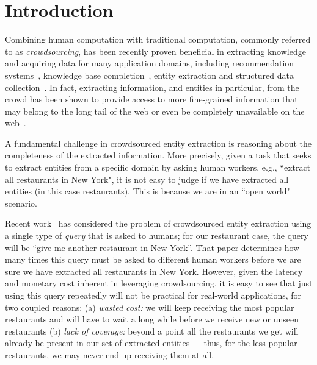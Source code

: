 


\section{Introduction}
\label{sec:intro}
Combining human computation with traditional computation, commonly referred to as {\em crowdsourcing}, has been recently proven beneficial in extracting knowledge and acquiring data for many application domains, including recommendation systems~\cite{amsterdamer:2014}, knowledge base completion~\cite{kondredi:2014}, entity extraction and structured data collection~\cite{park:2014,trushkowsky:2013}. In fact, extracting information, and entities in particular, from the crowd has been shown to provide access to more fine-grained information that may belong to the long tail of the web or even be completely unavailable on the web~\cite{franklin:2011, Parameswaran:2012, west:2014}.

A fundamental challenge in crowdsourced entity extraction is reasoning about the completeness of the extracted information. More precisely, given a task that seeks to extract entities from a specific domain by asking human workers, e.g., ``extract all restaurants in New York", it is not easy to judge if we have extracted all entities (in this case restaurants). This is because we are in an ``open world"~\cite{franklin:2011} scenario. 

Recent work~\cite{trushkowsky:2013} has considered the problem of crowdsourced entity extraction using a single type of {\em query} that is asked to humans; for our restaurant case, the query will be ``give me another restaurant in New York''. That paper determines how many times this query must be asked to different human workers before we are sure we have extracted all restaurants in New York. However, given the latency and monetary cost inherent in leveraging crowdsourcing, it is easy to see that just using this query repeatedly will not be practical for real-world applications, for two coupled reasons: (a) {\em wasted cost:} we will keep receiving the most popular restaurants and will have to wait a long while before we receive new or unseen restaurants (b) {\em lack of coverage:}  beyond a point all the restaurants we get will already be present in our set of extracted entities --- thus, for the less popular restaurants, we may never end up receiving them at all.


